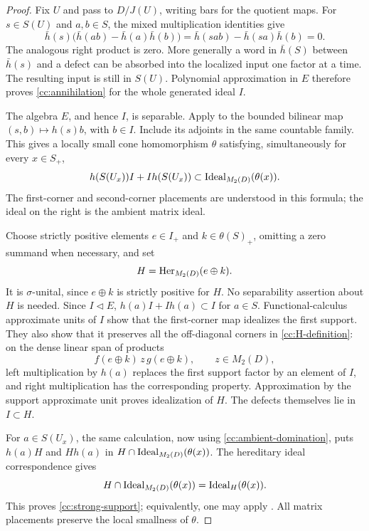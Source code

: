 \begin{proof}
Fix $U$ and pass to $D/J(U)$, writing bars for the quotient maps.
For $s\in S(U)$ and $a,b\in S$, the mixed multiplication identities give
\[
 \bar h(s)\bigl(\bar h(ab)-\bar h(a)\bar h(b)\bigr)
 =\bar h(sab)-\bar h(sa)\bar h(b)=0.
\]
The analogous right product is zero.  More generally a word in
$\bar h(S)$ between $\bar h(s)$ and a defect can be absorbed into
the localized input one factor at a time.  The resulting input is
still in $S(U)$.  Polynomial approximation in $E$ therefore proves
\eqref{cc:annihilation} for the whole generated ideal $I$.

The algebra $E$, and hence $I$, is separable.  Apply
 to the bounded bilinear map
$(s,b)\mapsto h(s)b$, with $b\in I$.  Include its adjoints in the
same countable family.  This gives a locally small cone homomorphism
$\theta$ satisfying, simultaneously for every $x\in S_+$,
\begin{equation}\label{cc:ambient-domination}
 h(S(U_x))I+Ih(S(U_x))
 \subset\operatorname{Ideal}_{M_2(D)}(\theta(x)).
\end{equation}
The first-corner and second-corner placements are understood in this
formula; the ideal on the right is the ambient matrix ideal.

Choose strictly positive elements $e\in I_+$ and
$k\in\theta(S)_+$, omitting a zero summand when necessary, and set
\begin{equation}\label{cc:H-definition}
 H=\operatorname{Her}_{M_2(D)}(e\oplus k).
\end{equation}
It is $\sigma$-unital, since $e\oplus k$ is strictly positive for $H$.
No separability assertion about $H$ is needed.  Since $I\lhd E$,
$h(a)I+Ih(a)\subset I$ for $a\in S$.  Functional-calculus
approximate units of $I$ show that the first-corner map idealizes
the first support.  They also show that it preserves all the
off-diagonal corners in \eqref{cc:H-definition}: on the dense
linear span of products
\[
 f(e\oplus k)\,z\,g(e\oplus k),\qquad z\in M_2(D),
\]
left multiplication by $h(a)$ replaces the first support factor by
an element of $I$, and right multiplication has the corresponding
property.  Approximation by the support approximate unit proves
idealization of $H$.  The defects themselves lie in $I\subset H$.

For $a\in S(U_x)$, the same calculation, now using
\eqref{cc:ambient-domination}, puts $h(a)H$ and $Hh(a)$ in
$H\cap\operatorname{Ideal}_{M_2(D)}(\theta(x))$.  The hereditary ideal
correspondence gives
\[
 H\cap\operatorname{Ideal}_{M_2(D)}(\theta(x))
 =\operatorname{Ideal}_H(\theta(x)).
\]
This proves \eqref{cc:strong-support}; equivalently, one may apply
.  All matrix placements preserve the
local smallness of $\theta$.
\end{proof}


